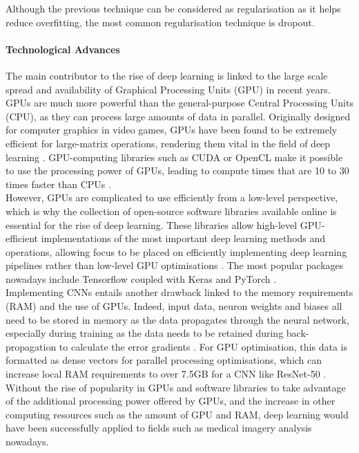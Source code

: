 Although the previous technique can be considered as regularisation as it  helps reduce overfitting, the most common regularisation technique is dropout.

\paragraph{Technological Advances}

The main contributor to the rise of deep learning is linked to the large scale spread and availability of  Graphical Processing Units (GPU) in recent years. GPUs are much more powerful than the general-purpose Central Processing Units (CPU), as they can process large amounts of data in parallel. Originally designed for computer graphics in video games, GPUs have been found to be extremely efficient for large-matrix operations, rendering them vital in the field of deep learning \citep{Caulfield2009}. GPU-computing libraries such as CUDA or OpenCL make it possible to use the processing power of GPUs, leading to compute times that are 10 to 30 times faster than CPUs \citep{Litjens2017}.\\

However, GPUs are complicated to use efficiently from a low-level perspective, which is why the collection of open-source software libraries available online is essential for the rise of deep learning. These libraries allow high-level GPU-efficient implementations of the most important deep learning methods and operations, allowing focus to be placed on efficiently implementing deep learning pipelines rather than low-level GPU optimisations \citep{Litjens2017}. The most popular packages nowadays include Tensorflow \citep{tensorflow2015-whitepaper} coupled with Keras \citep{chollet2015keras} and PyTorch \citep{pytorch}.\\

Implementing CNNs entails another drawback linked to the memory requirements (RAM) and the use of GPUs. Indeed, input data, neuron weights and biases all need to be stored in memory as the data propagates through the neural network, especially during training as the data needs to be retained during back-propagation to calculate the error gradients \citep{Geron2019}. For GPU optimisation, this data is formatted as dense vectors for parallel processing optimisations, which can increase local RAM requirements to over 7.5GB for a CNN like ResNet-50 \citep{Hanlon2016}.\\

Without the rise of popularity in GPUs and software libraries to take advantage of the additional processing power offered by GPUs, and the increase in other computing resources such as the amount of GPU and RAM, deep learning would have been successfully applied to fields such as medical imagery analysis nowadays.
